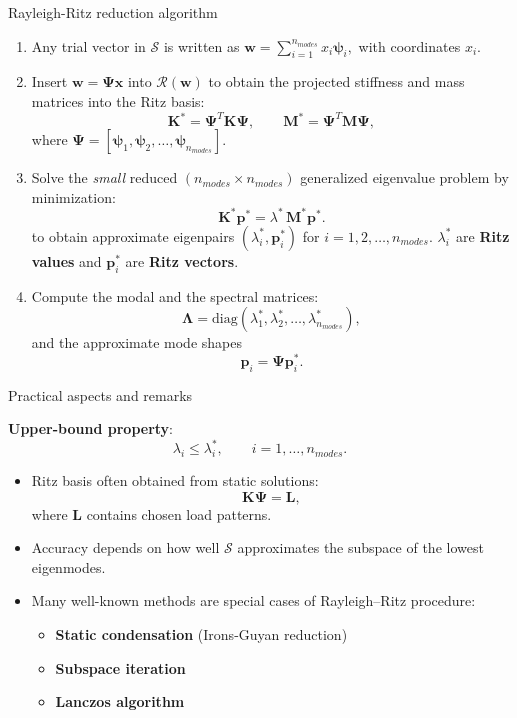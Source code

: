 \documentclass[aspectratio=169]{beamer}
\begin{document}
\begin{frame}{Rayleigh-Ritz reduction algorithm}
  \small \begin{enumerate}
    \item Any trial vector in $\mathcal S$ is written as
          \(
          \mathbf w = \sum_{i=1}^{n_{modes}} x_i \boldsymbol{\psi}_i ,
          \)
          with coordinates $x_i$.
    \item Insert $\mathbf w = \mathbf \Psi \mathbf x$ into $\mathcal R(\mathbf w)$ to obtain the projected stiffness and mass matrices into the Ritz basis:
          \[
            {\mathbf K}^* = \mathbf \Psi^T \mathbf K \mathbf \Psi, \qquad {\mathbf M}^* = \mathbf \Psi^T \mathbf M \mathbf \Psi,
          \]
          where $\mathbf \Psi = [\boldsymbol{\psi}_1, \boldsymbol{\psi}_2, \dots, \boldsymbol{\psi}_{n_{modes}}]$.
    \item Solve the \emph{small} reduced $(n_{modes}\times n_{modes})$ generalized eigenvalue problem by minimization:
          \[
            {\mathbf K}^* \mathbf p^* = \lambda^*\, {\mathbf M}^* \mathbf p^* .
          \]
          to obtain approximate eigenpairs $(\lambda^*_i, \mathbf p_i^*)$   for \( i = 1, 2, \dots, n_{modes} \). $\lambda^*_i$ are \textbf{Ritz values} and  $\mathbf p^*_i$ are \textbf{Ritz vectors}.
    \item Compute the modal and the spectral matrices:
          \[
            {\mathbf \Lambda} = \text{diag}(\lambda^*_1, \lambda^*_2, \dots, \lambda^*_{n_{modes}}) ,
          \]
          and the approximate mode shapes
          \[
            \mathbf p_i = \mathbf \Psi \mathbf p_i^* .
          \]
  \end{enumerate}
\end{frame}

\begin{frame}{Practical aspects and remarks}
  \begin{tcolorbox}[colback=darkred!10,colframe=darkred!40!black]
    \textbf{Upper-bound property}:
    \[
      \lambda_i \le \lambda_i^* , \qquad i=1,\dots,n_{modes} .
    \]
  \end{tcolorbox}
  \begin{itemize}
    \item Ritz basis often obtained from static solutions:
          \[
            \mathbf K \mathbf \Psi = \mathbf L,
          \]
          where $\mathbf L$ contains chosen load patterns.
    \item Accuracy depends on how well $\mathcal S$ approximates the
          subspace of the lowest eigenmodes.
    \item Many well-known methods are special cases of Rayleigh--Ritz procedure:
          \begin{itemize}
            \item \textbf{Static condensation} (Irons-Guyan reduction)
            \item \textbf{Subspace iteration}
            \item \textbf{Lanczos algorithm}
          \end{itemize}
  \end{itemize}
\end{frame}
\end{document}
